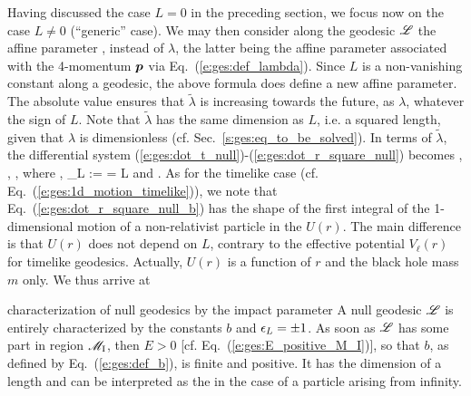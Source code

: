 Having discussed the case $L=0$ in the preceding section, we focus now on the
case $L\not= 0$ (``generic'' case). We may then
consider along the geodesic $\mathscr{L}$ the affine parameter
\be
   ,
\ee
instead of $\lambda$, the latter being the affine parameter associated with the 4-momentum $\bm{p}$
via Eq.~(\ref{e:ges:def_lambda}).
Since $L$ is a non-vanishing constant along a geodesic, the above formula
does define a new affine parameter. The absolute value ensures that
$\tilde{\lambda}$ is increasing towards the future, as $\lambda$, whatever
the sign of $L$. Note that $\tilde{\lambda}$ has the same
dimension as $L$, i.e. a squared length, given that $\lambda$ is dimensionless
(cf. Sec.~\ref{s:ges:eq_to_be_solved}).
In terms of $\tilde{\lambda}$,
the differential system (\ref{e:ges:dot_t_null})-(\ref{e:ges:dot_r_square_null})
becomes
\be \label{e:ges:dot_t_null_b}
   ,
\ee
\be \label{e:ges:dot_ph_null_b}
    ,
\ee
\be \label{e:ges:dot_r_square_null_b}
   ,
\ee
where
\be \label{e:ges:def_b}
     ,
\ee
\be \label{e:gis:def_epsilon_L}
    \eps_L :=  =  L
\ee
and
\be \label{e:ges:eff_pot_null}
    .
\ee
As for the timelike case (cf. Eq.~(\ref{e:ges:1d_motion_timelike})),
we note that Eq.~(\ref{e:ges:dot_r_square_null_b})
has the shape of the first integral of the
1-dimensional motion of a non-relativist particle in the
$U(r)$. The main difference is that $U(r)$ does not depend on $L$, contrary
to the effective potential $V_\ell(r)$ for timelike geodesics. Actually,
$U(r)$ is a function of $r$ and the black hole mass $m$ only.
We thus arrive at
\begin{tprop}{characterization of null geodesics by the impact parameter}{}
A null geodesic $\mathscr{L}$ is entirely characterized by the constants
$b$ and $\epsilon_L = \pm 1$.
As soon as $\mathscr{L}$ has some part in
region $\mathscr{M}_{\rm I}$, then $E>0$ [cf. Eq.~(\ref{e:ges:E_positive_M_I})], so that
$b$, as defined by Eq.~(\ref{e:ges:def_b}), is finite and positive. It has
the dimension of a length and can be interpreted as the
 in the case of a
particle arising from infinity.
\end{tprop}

